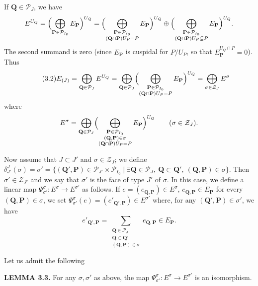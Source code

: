 \documentclass[10pt,a4paper]{article}
\theoremstyle{plain}
\theoremstyle{definition}
\theoremstyle{remark}
\newcommand{\cP}{\mathcal{P}}
\newcommand{\cZ}{\mathcal{Z}}
\newcommand{\bP}{\mathbf{P}}
\newcommand{\bQ}{\mathbf{Q}}
\begin{document}
If $\bQ \in \cP_J$, we have
\begin{equation*}
E^{U_Q}
= \Bigl(\bigoplus_{\bP \in \cP_{I_0}} E_{\bP}\Bigr)^{U_Q}
= \Bigl(\bigoplus_{\substack{\bP \in \cP_{I_0} \\ (\bQ \cap \bP)U_P = P}} E_{\bP}\Bigr)^{U_Q}
\oplus \Bigl(\bigoplus_{\substack{\bP \in \cP_{I_0} \\ (\bQ \cap \bP)U_P \subsetneq P}} E_{\bP}\Bigr)^{U_Q}.
\end{equation*}
The second summand is zero (since $E_{\bP}$ is cuspidal for $P/U_P$, so that $E_{\bP}^{U_Q \cap P} = 0$). Thus
\begin{equation}\tag{3.2}\label{eq:3.2}
E_{(J)} = \bigoplus_{\bQ \in \cP_J} E^{U_Q}
= \bigoplus_{\bQ \in \cP_J}\Bigl(\bigoplus_{\substack{\bP \in \cP_{I_0} \\ (\bQ \cap \bP)U_P = P}}E_{\bP}\Bigr)^{U_Q}
= \bigoplus_{\sigma \in \cZ_J} E^\sigma
\end{equation}
where
\begin{equation*}
E^\sigma = \bigoplus_{\bQ \in \cP_J}
\Bigl(\bigoplus_{\substack{\bP \in \cP_{I_0} \\ (\bQ,\bP) \in \sigma \\ (\bQ \cap \bP)U_P = P}} E_{\bP}\Bigr)^{U_Q}
\qquad (\sigma \in \cZ_J).
\end{equation*}

Now assume that $J \subset J'$ and $\sigma \in \cZ_J$; we define $\delta_{J'}^{J}(\sigma) = \sigma' = \{(\bQ',\bP) \in \cP_{J'} \times \cP_{I_0} \mid \exists \bQ \in \cP_J,\ \bQ \subset \bQ',\ (\bQ,\bP) \in \sigma\}$. Then $\sigma' \in \cZ_{J'}$ and we say that $\sigma'$ is the face of type $J'$ of $\sigma$. In this case, we define a linear map $\Psi_{\sigma'}^{\sigma} \colon E^\sigma \to E^{\sigma'}$ as follows. If $e = (e_{\bQ,\bP}) \in E^\sigma$, $e_{\bQ,\bP} \in E_{\bP}$ for every $(\bQ,\bP) \in \sigma$, we set $\Psi_{\sigma'}^{\sigma}(e) = (e'_{\bQ',\bP}) \in E^{\sigma'}$ where, for any $(\bQ',\bP) \in \sigma'$, we have
\begin{equation*}
e'_{\bQ',\bP} = \sum_{\substack{\bQ \in \cP_J \\ \bQ \subset \bQ' \\ (\bQ,\bP) \in \sigma}} e_{\bQ,\bP} \in E_{\bP}.
\end{equation*}

Let us admit the following

\medskip\noindent\textbf{LEMMA 3.3.}\quad
For any $\sigma, \sigma'$ as above, the map $\Psi_{\sigma'}^{\sigma} \colon E^\sigma \to E^{\sigma'}$ is an isomorphism.
\end{document}
